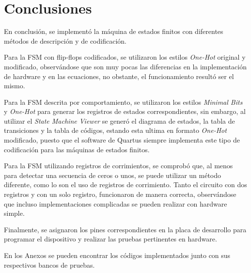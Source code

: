 \section{Conclusiones}
En conclusión, se implementó la máquina de estados finitos con diferentes métodos de descripción y de codificación.

Para la FSM con flip-flops codificados, se utilizaron los estilos \textit{One-Hot} original y modificado, observándose que son muy pocas las diferencias en la implementación de hardware y en las ecuaciones, no obstante, el funcionamiento resultó ser el mismo.

Para la FSM descrita por comportamiento, se utilizaron los estilos \textit{Minimal Bits} y \textit{One-Hot} para generar los registros de estados correspondientes, sin embargo, al utilizar el \textit{State Machine Viewer} se generó el diagrama de estados, la tabla de transiciones y la tabla de códigos, estando esta ultima en formato \textit{One-Hot} modificado, puesto que el software de Quartus siempre implementa este tipo de codificación para las máquinas de estados finitos.

Para la FSM utilizando registros de corrimientos, se comprobó que, al menos para detectar una secuencia de ceros o unos, se puede utilizar un método diferente, como lo son el uso de registros de corrimiento. Tanto el circuito con dos registros y con un solo registro, funcionaron de manera correcta, observándose que incluso implementaciones complicadas se pueden realizar con hardware simple.

Finalmente, se asignaron los pines correspondientes en la placa de desarrollo para programar el dispositivo y realizar las pruebas pertinentes en hardware.

En los Anexos se pueden encontrar los códigos implementados junto con sus respectivos bancos de pruebas.